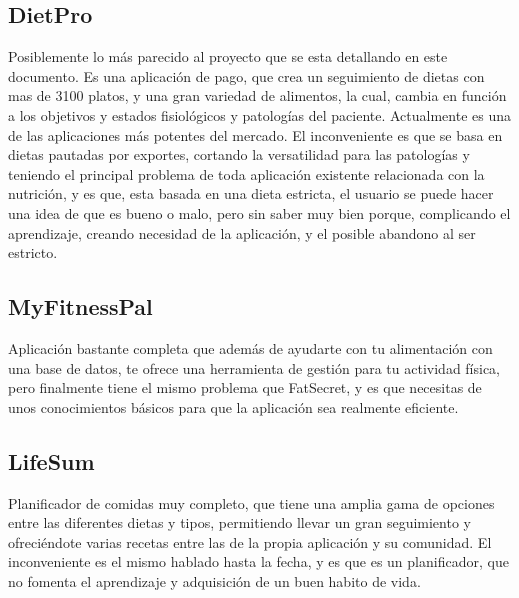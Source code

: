 \subsection{DietPro}
Posiblemente lo más parecido al proyecto que se esta detallando en este documento. Es una aplicación de pago, que crea un seguimiento de dietas con mas de 3100 platos, y una gran variedad de alimentos, la cual, cambia en función a los objetivos y estados fisiológicos y patologías del paciente. Actualmente es una de las aplicaciones más potentes del mercado. El inconveniente es que se basa en dietas pautadas por exportes, cortando la versatilidad para las patologías y teniendo el principal problema de toda aplicación existente relacionada con la nutrición, y es que, esta basada en una dieta estricta, el usuario se puede hacer una idea de que es bueno o malo, pero sin saber muy bien porque, complicando el aprendizaje, creando necesidad de la aplicación, y el posible abandono al ser estricto.\\
\subsection{MyFitnessPal}
Aplicación bastante completa que además de ayudarte con tu alimentación con una base de datos, te ofrece una herramienta de gestión para tu actividad física, pero finalmente tiene el mismo problema que FatSecret, y es que necesitas de unos conocimientos básicos para que la aplicación sea realmente eficiente.\\
\subsection{LifeSum}
Planificador de comidas muy completo, que tiene una amplia gama de opciones entre las diferentes dietas y tipos, permitiendo llevar un gran seguimiento y ofreciéndote varias recetas entre las de la propia aplicación y su comunidad. El inconveniente es el mismo hablado hasta la fecha, y es que es un planificador, que no fomenta el aprendizaje y adquisición de un buen habito de vida. 
	
